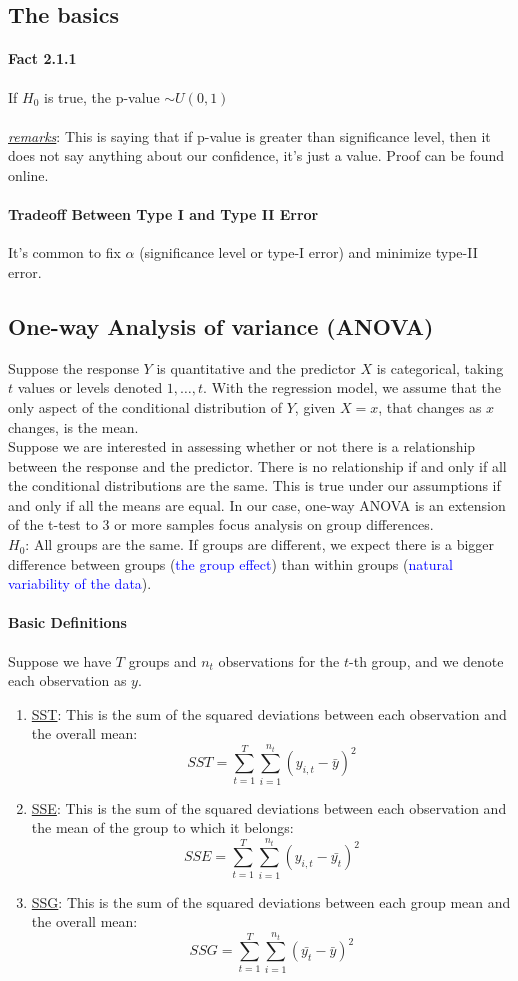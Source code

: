 \documentclass[11pt]{article}
\newcommand{\ti}[1]{\textit{#1}}
\newcommand{\under}[1]{\underline{#1}}
\begin{document}
\subsection{The basics}
\paragraph{Fact 2.1.1} If $H_0$ is true, the p-value $\sim U(0,1)$ \\\\
\under{\ti{remarks}}: This is saying that if p-value is greater than significance level, then it does not say anything about our confidence, it's just a value. Proof can be found online.
\paragraph{Tradeoff Between Type I and Type II Error}
It's common to fix $\alpha$ (significance level or type-I error) and minimize type-II error.
\subsection{One-way Analysis of variance (ANOVA)}
Suppose the response $Y$ is quantitative and the predictor $X$ is categorical, taking $t$ values or levels denoted $1, \hdots, t$. With the regression model, we assume that the only aspect of the conditional distribution of $Y$, given $X = x$, that changes as $x$ changes, is the mean. \\
Suppose we are interested in assessing whether or not there is a relationship between the response and the predictor. There is no relationship if and only if all the conditional distributions are the same. This is true under our assumptions if and only if all the means are equal.
In our case, one-way ANOVA is an extension of the t-test to 3 or more samples focus analysis on group differences.\\
$H_0$: All groups are the same.
If groups are different, we expect there is a bigger difference between groups (\textcolor{blue}{the group effect}) than within groups (\textcolor{blue}{natural variability of the data}).
\paragraph{Basic Definitions}
Suppose we have $T$ groups and $n_t$ observations for the $t$-th group, and we denote each observation as $y$.
\begin{enumerate}
	\item \under{SST}: This is the sum of the squared deviations between each observation and the overall mean:
	$$SST = \sum_{t=1}^T\sum_{i=1}^{n_t}(y_{i,t}-\bar{y})^2$$
	\item \under{SSE}: This is the sum of the squared deviations between each observation and the mean of the group to which it belongs:
	$$SSE = \sum_{t=1}^T\sum_{i=1}^{n_t}(y_{i,t}-\bar{y_t})^2$$
	\item \under{SSG}: This is the sum of the squared deviations between each group mean and the overall mean:
	$$SSG = \sum_{t=1}^T\sum_{i=1}^{n_t}(\bar{y_t}-\bar{y})^2$$
\end{enumerate}
\end{document}
